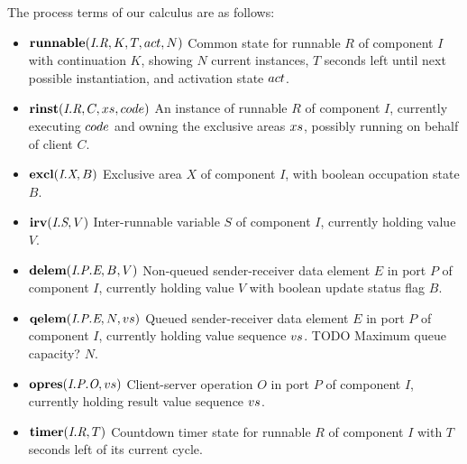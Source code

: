 \documentclass[twocolumn]{article}
\begin{document}
The process terms of our calculus are as follows:
\begin{itemize}
\item $\Trunnable{\Tr{R}{I}}{K}{T}{\Act}{N}$  \newline
Common state for runnable $R$ of component $I$ with continuation $K$, showing $N$ current instances, $T$ seconds left until next possible instantiation, and activation state $\Act$.
\item $\Trinst{\Tr{R}{I}}{C}{\Xs}{\Code}$ \newline
An instance of runnable $R$ of component $I$, currently executing $\Code$ and owning the exclusive areas $\Xs$, possibly running on behalf of client $C$.
\item $\Texcl{\Tx{X}{I}}{B}$ \newline
Exclusive area $X$ of component $I$, with boolean occupation state $B$.
\item $\Tirv{\Ts{S}{I}}{V}$ \newline
Inter-runnable variable $S$ of component $I$, currently holding value $V$.
\item $\Tdelem{\Tep{E}{P}{I}}{B}{V}$ \newline
Non-queued sender-receiver data element $E$ in port $P$ of component $I$, currently holding value $V$ with boolean update status flag $B$.
\item $\Tqelem{\Tep{E}{P}{I}}{N}{\Vs}$ \newline
Queued sender-receiver data element $E$ in port $P$ of component $I$, currently holding value sequence $\Vs$. TODO Maximum queue capacity? $N$.
\item $\Topres{\Top{O}{P}{I}}{\Vs}$ \newline
Client-server operation $O$ in port $P$ of component $I$, currently holding result value sequence $\Vs$.
\item $\Ttimer{\Tr{R}{I}}{T}$ \newline  %
Countdown timer state for runnable $R$ of component $I$ with $T$ seconds left of its current cycle.
\end{itemize}
\end{document}
